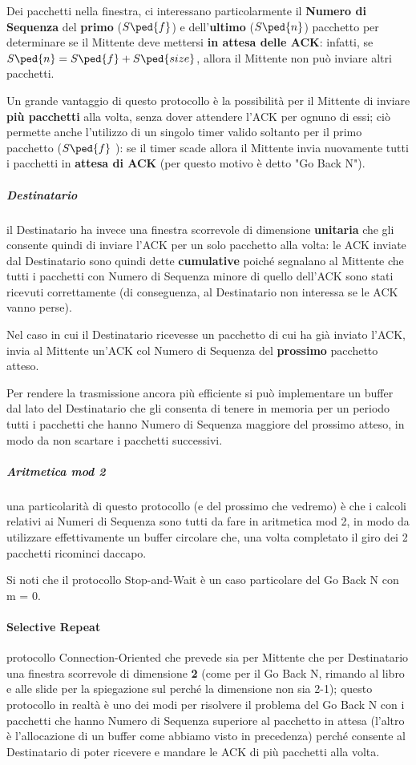 \documentclass[a4paper]{article}
\begin{document}
						Dei pacchetti nella finestra, ci interessano particolarmente il \textbf{Numero di Sequenza} del \textbf{primo} ($ S\ped{f}$) e dell'\textbf{ultimo} ($ S\ped{n}$) pacchetto per determinare se il Mittente deve mettersi \textbf{in attesa delle ACK}: infatti, se $ S\ped{n} = S\ped{f} + S\ped{size} $, allora il Mittente non può inviare altri pacchetti.
						
						Un grande vantaggio di questo protocollo è la possibilità per il Mittente di inviare \textbf{più pacchetti} alla volta, senza dover attendere l'ACK per ognuno di essi; ciò permette anche l'utilizzo di un singolo timer valido soltanto per il primo pacchetto ($ S\ped{f} $ ): se il timer scade allora il Mittente invia nuovamente tutti i pacchetti in \textbf{attesa di ACK} (per questo motivo è detto "Go Back N").
						
					\subparagraph{Destinatario}
						il Destinatario ha invece una finestra scorrevole di dimensione \textbf{unitaria} che gli consente quindi di inviare l'ACK per un solo pacchetto alla volta: le ACK inviate dal Destinatario sono quindi dette \textbf{cumulative} poiché segnalano al Mittente che tutti i pacchetti con Numero di Sequenza minore di quello dell'ACK sono stati ricevuti correttamente (di conseguenza, al Destinatario non interessa se le ACK vanno perse). 
						
						Nel caso in cui il Destinatario ricevesse un pacchetto di cui ha già inviato l'ACK, invia al Mittente un'ACK col Numero di Sequenza del \textbf{prossimo} pacchetto atteso.
						
						Per rendere la trasmissione ancora più efficiente si può implementare un buffer dal lato del Destinatario che gli consenta di tenere in memoria per un periodo tutti i pacchetti che hanno Numero di Sequenza maggiore del prossimo atteso, in modo da non scartare i pacchetti successivi.
						
					\subparagraph{Aritmetica mod 2}
						una particolarità di questo protocollo (e del prossimo che vedremo) è che i calcoli relativi ai Numeri di Sequenza sono tutti da fare in aritmetica mod 2, in modo da utilizzare effettivamente un buffer circolare che, una volta completato il giro dei 2 pacchetti ricominci daccapo.
						
						Si noti che il protocollo Stop-and-Wait è un caso particolare del Go Back N con m = 0.
						
				\paragraph{Selective Repeat}
					protocollo Connection-Oriented che prevede sia per Mittente che per Destinatario una finestra scorrevole di dimensione \textbf{2} (come per il Go Back N, rimando al libro e alle slide per la spiegazione sul perché la dimensione non sia 2-1); questo protocollo in realtà è uno dei modi per risolvere il problema del Go Back N con i pacchetti che hanno Numero di Sequenza superiore al pacchetto in attesa (l'altro è l'allocazione di un buffer come abbiamo visto in precedenza) perché consente al Destinatario di poter ricevere e mandare le ACK di più pacchetti alla volta.
					
\end{document}
